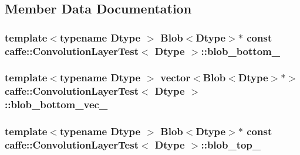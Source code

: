 \subsection{Member Data Documentation}
\hypertarget{classcaffe_1_1_convolution_layer_test_a21716aea5f577453a99d8e3b81a3d5c1}{
\subsubsection[{blob\+\_\+bottom\+\_\+}]{\setlength{\rightskip}{0pt plus 5cm}template$<$typename Dtype $>$ {\bf Blob}$<$Dtype$>$$\ast$ const {\bf caffe\+::\+Convolution\+Layer\+Test}$<$ Dtype $>$\+::blob\+\_\+bottom\+\_\+\hspace{0.3cm}{\ttfamily [protected]}}}\label{classcaffe_1_1_convolution_layer_test_a21716aea5f577453a99d8e3b81a3d5c1}
\hypertarget{classcaffe_1_1_convolution_layer_test_af56ff97244fa2e368cef99244d2d9710}{
\subsubsection[{blob\+\_\+bottom\+\_\+vec\+\_\+}]{\setlength{\rightskip}{0pt plus 5cm}template$<$typename Dtype $>$ vector$<${\bf Blob}$<$Dtype$>$$\ast$$>$ {\bf caffe\+::\+Convolution\+Layer\+Test}$<$ Dtype $>$\+::blob\+\_\+bottom\+\_\+vec\+\_\+\hspace{0.3cm}{\ttfamily [protected]}}}\label{classcaffe_1_1_convolution_layer_test_af56ff97244fa2e368cef99244d2d9710}
\hypertarget{classcaffe_1_1_convolution_layer_test_a46f8f672a46471f36229b33353b74819}{
\subsubsection[{blob\+\_\+top\+\_\+}]{\setlength{\rightskip}{0pt plus 5cm}template$<$typename Dtype $>$ {\bf Blob}$<$Dtype$>$$\ast$ const {\bf caffe\+::\+Convolution\+Layer\+Test}$<$ Dtype $>$\+::blob\+\_\+top\+\_\+\hspace{0.3cm}{\ttfamily [protected]}}}\label{classcaffe_1_1_convolution_layer_test_a46f8f672a46471f36229b33353b74819}
